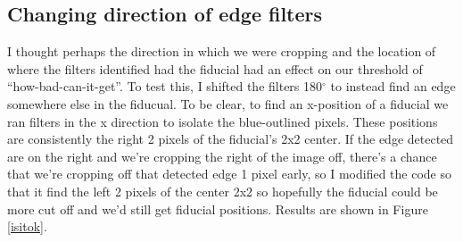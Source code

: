 \documentclass[10pt]{scrartcl}
\begin{document}


\subsection{Changing direction of edge filters} %
\label{sub:changing_direction_of_edge_filters}


I thought perhaps the direction in which we were cropping and the location of where the filters identified had the fiducial had an effect on our threshold of ``how-bad-can-it-get''. To test this, I shifted the filters 180$^\circ$ to instead find an edge somewhere else in the fiducual. To be clear, to find an x-position of a fiducial we ran filters in the x direction to isolate the blue-outlined pixels. These positions are consistently the right 2 pixels of the fiducial's 2x2 center. If the edge detected are on the right and we're cropping the right of the image off, there's a chance that we're cropping off that detected edge 1 pixel early, so I modified the code so that it find the left 2 pixels of the center 2x2 so hopefully the fiducial could be more cut off and we'd still get fiducial positions. Results are shown in Figure \ref{isitok}.
\end{document}
